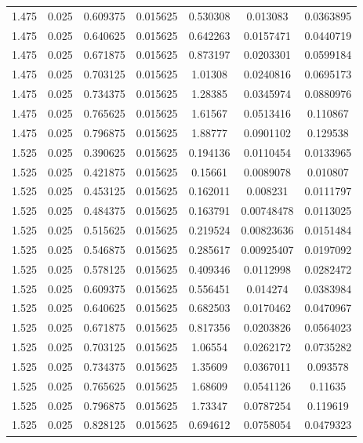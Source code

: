 \begin{table}[bh]
\begin{center}
{\begin{tabular}{ccccccc}
1.475	 & 0.025 & 	0.609375	 & 0.015625	 & 0.530308	 & 0.013083	 & 0.0363895 \\ 
1.475	 & 0.025 & 	0.640625	 & 0.015625	 & 0.642263	 & 0.0157471	 & 0.0440719 \\ 
1.475	 & 0.025 & 	0.671875	 & 0.015625	 & 0.873197	 & 0.0203301	 & 0.0599184 \\ 
1.475	 & 0.025 & 	0.703125	 & 0.015625	 & 1.01308	 & 0.0240816	 & 0.0695173 \\ 
1.475	 & 0.025 & 	0.734375	 & 0.015625	 & 1.28385	 & 0.0345974	 & 0.0880976 \\ 
1.475	 & 0.025 & 	0.765625	 & 0.015625	 & 1.61567	 & 0.0513416	 & 0.110867 \\ 
1.475	 & 0.025 & 	0.796875	 & 0.015625	 & 1.88777	 & 0.0901102	 & 0.129538 \\ 
1.525	 & 0.025 & 	0.390625	 & 0.015625	 & 0.194136	 & 0.0110454	 & 0.0133965 \\ 
1.525	 & 0.025 & 	0.421875	 & 0.015625	 & 0.15661	 & 0.0089078	 & 0.010807 \\ 
1.525	 & 0.025 & 	0.453125	 & 0.015625	 & 0.162011	 & 0.008231	 & 0.0111797 \\ 
1.525	 & 0.025 & 	0.484375	 & 0.015625	 & 0.163791	 & 0.00748478	 & 0.0113025 \\ 
1.525	 & 0.025 & 	0.515625	 & 0.015625	 & 0.219524	 & 0.00823636	 & 0.0151484 \\ 
1.525	 & 0.025 & 	0.546875	 & 0.015625	 & 0.285617	 & 0.00925407	 & 0.0197092 \\ 
1.525	 & 0.025 & 	0.578125	 & 0.015625	 & 0.409346	 & 0.0112998	 & 0.0282472 \\ 
1.525	 & 0.025 & 	0.609375	 & 0.015625	 & 0.556451	 & 0.014274	 & 0.0383984 \\ 
1.525	 & 0.025 & 	0.640625	 & 0.015625	 & 0.682503	 & 0.0170462	 & 0.0470967 \\ 
1.525	 & 0.025 & 	0.671875	 & 0.015625	 & 0.817356	 & 0.0203826	 & 0.0564023 \\ 
1.525	 & 0.025 & 	0.703125	 & 0.015625	 & 1.06554	 & 0.0262172	 & 0.0735282 \\ 
1.525	 & 0.025 & 	0.734375	 & 0.015625	 & 1.35609	 & 0.0367011	 & 0.093578 \\ 
1.525	 & 0.025 & 	0.765625	 & 0.015625	 & 1.68609	 & 0.0541126	 & 0.11635 \\ 
1.525	 & 0.025 & 	0.796875	 & 0.015625	 & 1.73347	 & 0.0787254	 & 0.119619 \\ 
1.525	 & 0.025 & 	0.828125	 & 0.015625	 & 0.694612	 & 0.0758054	 & 0.0479323 \\ 

\end{tabular}}
\end{center}
\end{table}
